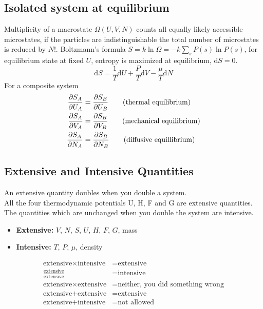 \documentclass[a4paper, norsk, 8pt]{article}
\begin{document}
\begin{multicols*}{3}
\subsection*{\footnotesize  Isolated system at equilibrium}
Multiplicity of a macrostate $\Omega(U,V,N)$ counts all equally likely accessible microstates, if the particles are indistinguishable the total number of microstates is reduced by $N!$. Boltzmann's formula $S=k\ln{\Omega} = -k\sum_{s}P(s)\ln{P(s)}$, for equilibrium state at fixed $U$, entropy is maximized at equilibrium, $\mbox{d}S=0$.
\begin{equation*}
    \mbox{d}S = \frac{1}{T}\mbox{d}U  + \frac{P}{T}\mbox{d}V - \frac{\mu}{T}\mbox{d}N
\end{equation*}
For a composite system
\begin{align*}
  \pdv{S_A}{U_A} &= \pdv{S_B}{U_B} \qquad (\text{thermal equilibrium}) \\
  \pdv{S_A}{V_A} &= \pdv{S_B}{V_B} \qquad (\text{mechanical equilibrium}) \\
  \pdv{S_A}{N_A} &= \pdv{S_B}{N_B} \qquad (\text{diffusive equillibrium})
\end{align*}

\subsection*{\footnotesize  Extensive and Intensive Quantities}
An extensive quantity doubles when you double a system.\\
All the four thermodynamic potentials U, H, F and G are extensive quantities.
The quantities which are unchanged when you double the system are intensive.
\begin{itemize}
    \item \textbf{Extensive:} $V$, $N$, $S$, $U$, $H$, $F$, $G$, mass
    \item \textbf{Intensive:} $T$, $P$, $\mu$, density
\end{itemize}
\begin{align*}
    \text{extensive} \times \text{intensive} &= \text{extensive} \\
     \frac{\text{extensive}}{\text{extensive}} &= \text{intensive} \\
     \text{extensive} \times \text{extensive} &= \text{neither, you did something wrong} \\
     \text{extensive} + \text{extensive} &= \text{extensive} \\
     \text{extensive} + \text{intensive} &= \text{not allowed}
\end{align*}



\end{multicols*}
\end{document}
